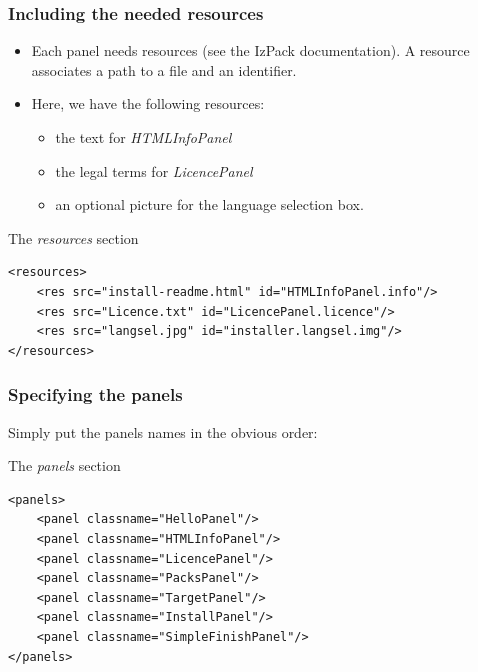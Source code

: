 \documentclass{beamer}
\begin{document}

\begin{frame}[containsverbatim]

\frametitle{Including the needed resources}

\begin{itemize}

  \item Each panel needs resources (see the IzPack documentation). A resource
  associates a path to a file and an identifier.

  \item Here, we have the following resources:
    \begin{itemize}
      \item the text for \textsl{HTMLInfoPanel}
      \item the legal terms for \textsl{LicencePanel}
      \item an optional picture for the language selection box.
    \end{itemize}

\end{itemize}

\begin{block}{The \textsl{resources} section}
\tiny
\begin{verbatim}
<resources>
    <res src="install-readme.html" id="HTMLInfoPanel.info"/>
    <res src="Licence.txt" id="LicencePanel.licence"/>
    <res src="langsel.jpg" id="installer.langsel.img"/>
</resources>
\end{verbatim}
\end{block}

\end{frame}


\begin{frame}[containsverbatim]

\frametitle{Specifying the panels}

Simply put the panels names in the obvious order:

\begin{block}{The \textsl{panels} section}
\tiny
\begin{verbatim}
<panels>
    <panel classname="HelloPanel"/>
    <panel classname="HTMLInfoPanel"/>
    <panel classname="LicencePanel"/>
    <panel classname="PacksPanel"/>
    <panel classname="TargetPanel"/>
    <panel classname="InstallPanel"/>
    <panel classname="SimpleFinishPanel"/>
</panels>
\end{verbatim}
\end{block}

\end{frame}
\end{document}

